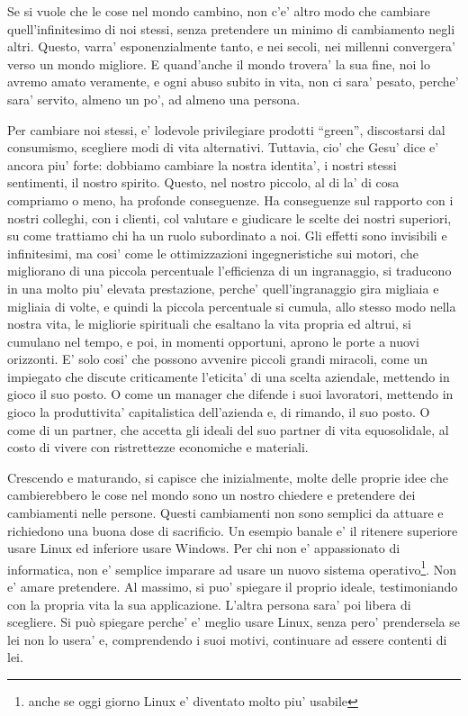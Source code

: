 Se si vuole che le cose nel mondo cambino, non c'e' altro modo che cambiare quell'infinitesimo di noi stessi, senza pretendere un minimo di cambiamento negli altri. Questo, varra' esponenzialmente tanto, e nei secoli, nei millenni convergera' verso un mondo migliore. E quand'anche il mondo trovera' la sua fine, noi lo avremo amato veramente, e ogni abuso subito in vita, non ci sara' pesato, perche' sara' servito, almeno un po', ad almeno una persona.

Per cambiare noi stessi, e' lodevole privilegiare prodotti ``green'', discostarsi dal consumismo, scegliere modi di vita alternativi. Tuttavia, cio' che Gesu' dice e' ancora piu' forte: dobbiamo cambiare la nostra identita', i nostri stessi sentimenti, il nostro spirito. Questo, nel nostro piccolo, al di la' di cosa compriamo o meno, ha profonde conseguenze. Ha conseguenze sul rapporto con i nostri colleghi, con i clienti, col valutare e giudicare le scelte dei nostri superiori, su come trattiamo chi ha un ruolo subordinato a noi. Gli effetti sono invisibili e infinitesimi, ma cosi' come le ottimizzazioni ingegneristiche sui motori, che migliorano di una piccola percentuale l'efficienza di un ingranaggio, si traducono in una molto piu' elevata prestazione, perche' quell'ingranaggio gira migliaia e migliaia di volte, e quindi la piccola percentuale si cumula, allo stesso modo nella nostra vita, le migliorie spirituali che esaltano la vita propria ed altrui, si cumulano nel tempo, e poi, in momenti opportuni, aprono le porte a nuovi orizzonti. E' solo cosi' che possono avvenire piccoli grandi miracoli, come un impiegato che discute criticamente l'eticita' di una scelta aziendale, mettendo in gioco il suo posto. O come un manager che difende i suoi lavoratori, mettendo in gioco la produttivita' capitalistica dell'azienda e, di rimando, il suo posto. O come di un partner, che accetta gli ideali del suo partner di vita equosolidale, al costo di vivere con ristrettezze economiche e materiali.

Crescendo e maturando, si capisce che inizialmente, molte delle proprie idee che cambierebbero le cose nel mondo sono un nostro chiedere e pretendere dei cambiamenti nelle persone. Questi cambiamenti non sono semplici da attuare e richiedono una buona dose di sacrificio. Un esempio banale e' il ritenere superiore usare Linux ed inferiore usare Windows. Per chi non e' appassionato di informatica, non e' semplice imparare ad usare un nuovo sistema operativo\footnote{anche se oggi giorno Linux e' diventato molto piu' usabile}.
Non e' amare pretendere. Al massimo, si puo' spiegare il proprio ideale, testimoniando con la propria vita la sua applicazione. L'altra persona sara' poi libera di scegliere. Si può spiegare perche' e' meglio usare Linux, senza pero' prendersela se lei non lo usera' e, comprendendo i suoi motivi, continuare ad essere contenti di lei.

